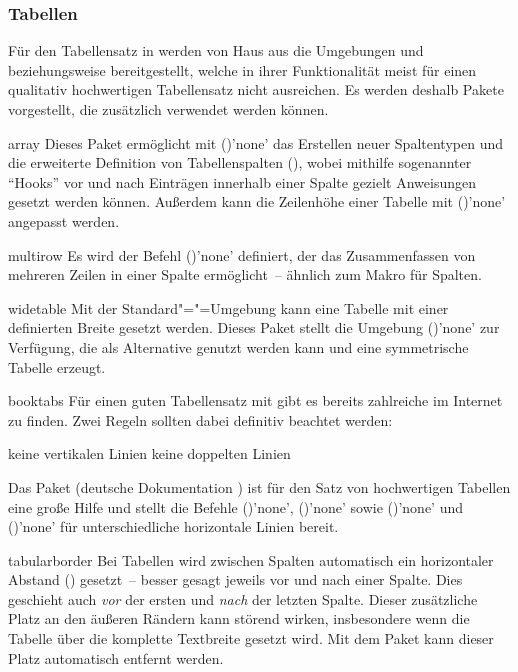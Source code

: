 \subsubsection{Tabellen}
%
%
Für den Tabellensatz in  werden von Haus aus die Umgebungen 
 und  beziehungsweise 
 bereitgestellt, welche in ihrer Funktionalität meist 
für einen qualitativ hochwertigen Tabellensatz nicht ausreichen. Es werden 
deshalb Pakete vorgestellt, die zusätzlich verwendet werden können. 
\begin{packages}
\item[array]
  Dieses Paket ermöglicht mit ()'none' das 
  Erstellen neuer Spaltentypen und die erweiterte Definition von Tabellenspalten
  (\PValue{>\PParameter{\dots}}\PValue{<\PParameter{\dots}}), 
  wobei mithilfe sogenannter \enquote{Hooks} vor und nach Einträgen innerhalb 
  einer Spalte gezielt Anweisungen gesetzt werden können. Außerdem kann die 
  Zeilenhöhe einer Tabelle mit ()'none' 
  angepasst werden. 
\item[multirow]
  Es wird der Befehl ()'none' definiert, der 
  das Zusammenfassen von mehreren Zeilen in einer Spalte ermöglicht~-- ähnlich 
  zum Makro  für Spalten.
\item[widetable]
  Mit der Standard"="=Umgebung  kann eine 
  Tabelle mit einer definierten Breite gesetzt werden. Dieses Paket stellt die 
  Umgebung ()'none' zur Verfügung, 
  die als Alternative genutzt werden kann und eine symmetrische Tabelle erzeugt.
\item[booktabs]
  Für einen guten Tabellensatz mit  gibt es bereits zahlreiche 
   im 
  Internet zu finden. Zwei Regeln sollten dabei definitiv beachtet werden:
  \begin{enumerate}[itemindent=0pt,labelwidth=*,labelsep=1em,label=\Roman*.]
  \stditem keine vertikalen Linien
  \stditem keine doppelten Linien
  \end{enumerate}
  Das Paket  (deutsche Dokumentation ) 
  ist für den Satz von hochwertigen Tabellen eine große Hilfe und stellt die 
  Befehle ()'none', 
  ()'none' sowie 
  ()'none' und 
  ()'none'
  für unterschiedliche horizontale Linien bereit.
\item[tabularborder]
  Bei Tabellen wird zwischen Spalten automatisch ein horizontaler Abstand 
  () gesetzt~-- besser gesagt jeweils vor und nach einer 
  Spalte. Dies geschieht auch \emph{vor} der ersten und \emph{nach} der letzten 
  Spalte. Dieser zusätzliche Platz an den äußeren Rändern kann störend wirken, 
  insbesondere wenn die Tabelle über die komplette Textbreite gesetzt wird. Mit 
  dem Paket  kann dieser Platz automatisch entfernt 
  werden.
  

\end{packages}
